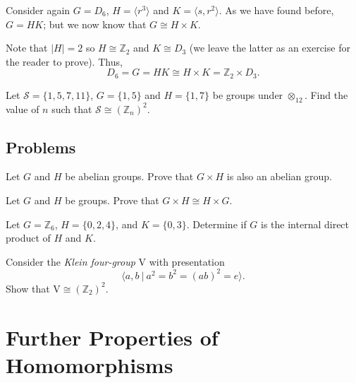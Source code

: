 \begin{example}
    Consider again $G = D_6$, $H = \langle r^3 \rangle$ and $K = \langle s, r^2 \rangle$. As we have found before, $G = HK$; but we now know that $G \cong H \times K$.

    Note that $|H| = 2$ so $H \cong \mathbb{Z}_2$ and $K \cong D_3$ (we leave the latter as an exercise for the reader to prove). Thus,
    \[
        D_6 = G = HK \cong H \times K = \mathbb{Z}_2 \times D_3.
    \]
\end{example}

\begin{exercise}
    Let $\mathcal{S} = \{1, 5, 7, 11\}$, $G = \{1, 5\}$ and $H = \{1, 7\}$ be groups under $\otimes_{12}$. Find the value of $n$ such that $\mathcal{S} \cong (\mathbb{Z}_n)^2$.
\end{exercise}

\section{Problems}
\begin{problem}\label{problem-external-direct-product-of-abelian-groups-is-abelian}
    Let $G$ and $H$ be abelian groups. Prove that $G \times H$ is also an abelian group.
\end{problem}

\begin{problem}
    Let $G$ and $H$ be groups. Prove that $G \times H \cong H \times G$.
\end{problem}

\begin{problem}
    Let $G = \mathbb{Z}_6$, $H = \{0, 2, 4\}$, and $K = \{0, 3\}$. Determine if $G$ is the internal direct product of $H$ and $K$.
\end{problem}

\begin{problem}
    Consider the \textit{Klein four-group} $\mathrm{V}$ with presentation
    \[
        \langle a, b \ | \ a^2 = b^2 = (ab)^2 = e \rangle.
    \]
    Show that $\mathrm{V} \cong (\mathbb{Z}_2)^2$.
\end{problem}

\chapter{Further Properties of Homomorphisms}
